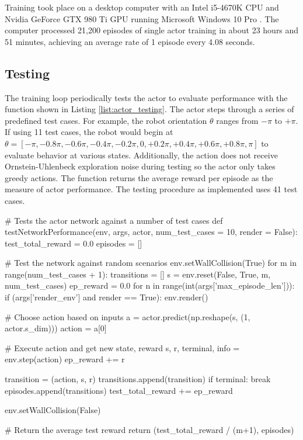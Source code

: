 Training took place on a desktop computer with an Intel i5-4670K CPU and Nvidia GeForce GTX 980 Ti GPU running Microsoft Windows 10 Pro \cite{intel}\cite{980ti}\cite{windows}. The computer processed 21,200 episodes of single actor training in about 23 hours and 51 minutes, achieving an average rate of 1 episode every 4.08 seconds.

\subsection{Testing}
The training loop periodically tests the actor to evaluate performance with the  function shown in Listing \ref{list:actor_testing}. The actor steps through a series of predefined test cases. For example, the robot orientation $\theta$ ranges from $-\pi$ to $+\pi$. If using 11 test cases, the robot would begin at $\theta=[-\pi, -0.8\pi, -0.6\pi,\allowbreak -0.4\pi,\allowbreak -0.2\pi,\allowbreak 0, +0.2\pi, +0.4\pi, +0.6\pi, +0.8\pi, \pi]$ to evaluate behavior at various states. Additionally, the action does not receive Ornstein-Uhlenbeck exploration noise during testing so the actor only takes greedy actions. The function returns the average reward per episode as the measure of actor performance. The testing procedure as implemented uses 41 test cases.
\begin{python}[caption={Actor Testing Function},label={list:actor_testing}]
# Tests the actor network against a number of test cases
def testNetworkPerformance(env, args, actor, num_test_cases = 10, render = False):
    test_total_reward = 0.0
    episodes = []

    # Test the network against random scenarios
    env.setWallCollision(True)
    for m in range(num_test_cases + 1):
        transitions = []
        s = env.reset(False, True, m, num_test_cases)
        ep_reward = 0.0
        for n in range(int(args['max_episode_len'])):
            if (args['render_env'] and render == True):
                env.render()

            # Choose action based on inputs
            a = actor.predict(np.reshape(s, (1, actor.s_dim)))
            action = a[0]

            # Execute action and get new state, reward
            s, r, terminal, info = env.step(action)
            ep_reward += r

            transition = (action, s, r)
            transitions.append(transition)
            if terminal:
                break
        episodes.append(transitions)
        test_total_reward += ep_reward

    env.setWallCollision(False)

    # Return the average test reward
    return (test_total_reward / (m+1), episodes)

\end{python}
%

